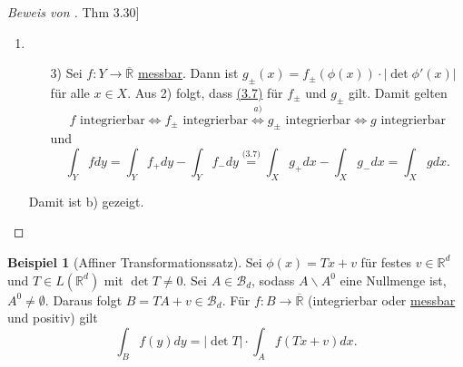 \documentclass[a4paper]{scrreprt}
\newcommand{\R}{\mathbb{R}}
\newcommand{\Rq}{\overline{\R}}
\newcommand{\Borel}{\mathcal{B}}
\newcommand{\Bd}{\Borel_d}
\newcommand{\jlabel}[1]{\label{j_#1}}
\newcommand{\jshortlink}[1]{\jhyperref{#1}{\text{#1}}}
\newcommand{\jhyperref}[2]{\hyperref[j_#1]{#2}}
\newcommand{\jlink}[1]{\jhyperref{#1}{#1}}
\newcommand{\jabb}[3]{ #1: #2 \rightarrow #3 }
\theoremstyle{plain}
\theoremstyle{definition}
\newtheorem{expl}[thm]{Beispiel}
\begin{document}
{{{{\begin{proof}[Beweis von \jlink{Thm 3.30}]
\begin{enumerate}
        \item
            \begin{itemize}
                \item[3)] Sei $\jabb{f}{Y}{\Rq}$ \jlink{messbar}. Dann ist $g_\pm(x) = f_\pm(\phi(x))\cdot |\det \phi'(x)|$ für alle $x\in X$. Aus 2) folgt, dass \jlink{(3.7)} für $f_\pm$ und $g_\pm$ gilt. Damit gelten
                \[
                    f \text{ integrierbar} \Leftrightarrow f_\pm \text{ integrierbar} \overset{a)}{\Leftrightarrow} g_\pm \text{ integrierbar} \Leftrightarrow g \text{ integrierbar}
                \]
                und
                \[
                    \int_Y f dy = \int_Y f_+ dy - \int_Y f_- dy \overset{\jshortlink{(3.7)}}{=} \int_X g_+ dx - \int_X g_- dx = \int_X g dx.
                \]
            \end{itemize}
            Damit ist b) gezeigt.
    \end{enumerate}

\end{proof}


\begin{expl}[Affiner Transformationssatz]
    \jlabel{Bsp 3.34}
    Sei $\phi(x) = Tx + v$ für festes $v\in \R^d$ und $T\in L(\R^d)$ mit $\det T \ne 0$. Sei $A\in \Bd$, sodass $A\backslash A^0$ eine Nullmenge ist, $A^0 \ne \emptyset$. Daraus folgt $B=TA+v\in \Bd$. Für $\jabb{f}{B}{\Rq}$ (integrierbar oder \jlink{messbar} und positiv) gilt
    \[
        \int_B f(y) dy = |\det T|\cdot \int_A f(Tx+v) dx.
    \]
\end{expl}

}}}}
\end{document}
